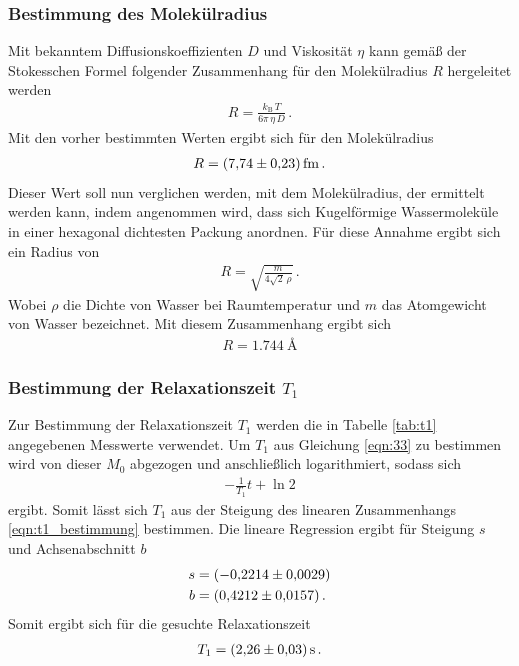 \subsubsection{Bestimmung des Molekülradius}
\label{subsubsec:molekuelradius}
Mit bekanntem Diffusionskoeffizienten $D$ und Viskosität $\eta$ kann gemäß
der Stokesschen Formel folgender Zusammenhang für den Molekülradius $R$ hergeleitet werden
\begin{align}
  \label{eqn:stokes}
  R = \frac{k_\text{B} \, T}{6 \pi \, \eta \, D} \, .
\end{align}
Mit den vorher bestimmten Werten ergibt sich für den Molekülradius
\begin{align*}
  R = \SI{7.74+-0.23}{\femto\meter} \, .
\end{align*}
Dieser Wert soll nun verglichen werden, mit dem Molekülradius, der ermittelt werden kann, indem angenommen wird, dass sich
Kugelförmige Wassermoleküle in einer hexagonal dichtesten Packung anordnen.
Für diese Annahme ergibt sich ein Radius von
\begin{align*}
  R = \sqrt{\frac{m}{4\sqrt{2} \, \rho}} \, .
\end{align*}
Wobei $\rho$ die Dichte von Wasser bei Raumtemperatur und $m$ das Atomgewicht von Wasser bezeichnet.
Mit diesem Zusammenhang ergibt sich
\begin{align*}
  R = \SI{1.744}{\angstrom}
\end{align*}
\subsubsection{Bestimmung der Relaxationszeit $T_{1}$}
\label{subsubsec:T1}
Zur Bestimmung der Relaxationszeit $T_{1}$ werden die in Tabelle \ref{tab:t1} angegebenen
Messwerte verwendet. Um $T_{1}$ aus Gleichung \eqref{eqn:33} zu bestimmen wird von dieser $M_{0}$ abgezogen und anschließlich logarithmiert, sodass sich
\begin{align}
  \label{eqn:t1_bestimmung}
  -\frac{1}{T_{1}} t + \ln 2
\end{align}
ergibt.
Somit lässt sich $T_{1}$ aus der Steigung des linearen Zusammenhangs \eqref{eqn:t1_bestimmung} bestimmen.
Die lineare Regression ergibt für Steigung $s$ und Achsenabschnitt $b$
\begin{align*}
  s &= \SI{-0.2214+-0.0029}{}\\
  b &= \SI{0.4212+-0.0157}{} \, .
\end{align*}
Somit ergibt sich für die gesuchte Relaxationszeit
\begin{align*}
  T_{1} = \SI{2.26+-0.03}{\second} \, .
\end{align*}


